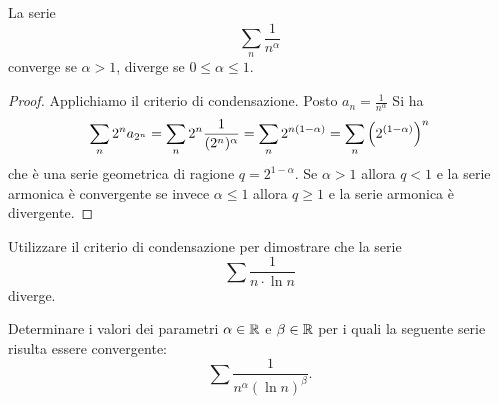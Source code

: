 \begin{corollary}
\mymark{***}
%
La serie
\[
 \sum_n \frac{1}{n^\alpha}
\]
converge se $\alpha>1$,
diverge se $0\le \alpha\le 1$.
\end{corollary}
%
\begin{proof}
\mymark{***}
Applichiamo il criterio di condensazione. Posto $a_n = \frac 1{n^\alpha}$ Si ha
\[
  \sum_n 2^n a_{2^n} = \sum_n 2^n \frac{1}{(2^n)^\alpha}
  = \sum_n 2^{n(1-\alpha)}
  = \sum_n {\left( 2^{(1-\alpha)} \right)}^n
\]
che è una serie geometrica di ragione $q=2^{1-\alpha}$.
Se $\alpha>1$ allora $q<1$ e la serie armonica è convergente
se invece $\alpha \le 1$ allora $q\ge 1$ e la serie
armonica è divergente.
\end{proof}

\begin{exercise}
Utilizzare il criterio di condensazione per dimostrare che la serie
\[
  \sum \frac{1}{n \cdot \ln n}
\]
diverge.
\end{exercise}

\begin{exercise}
  Determinare i valori dei parametri $\alpha\in {\mathbb R}$ e $\beta\in {\mathbb R}$
  per i quali la seguente serie risulta essere convergente:
  \[
    \sum \frac{1}{n^\alpha (\ln n)^\beta}.
  \]
\end{exercise}


